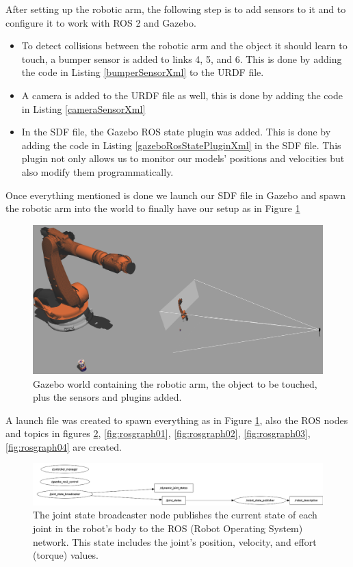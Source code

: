 \documentclass[12pt,oneside]{article}
\begin{document}
After setting up the robotic arm, the following step is to add sensors to it and to configure it to work with ROS 2 and Gazebo.
\begin{itemize}
\item To detect collisions between the robotic arm and the object it should learn to touch, a bumper sensor is added to links 4, 5, and 6. This is done by adding the code in Listing \ref{bumperSensorXml} to the URDF file.

\item A camera is added to the URDF file as well, this is done by adding the code in Listing \ref{cameraSensorXml}

\item In the SDF file, the Gazebo ROS state plugin was added. This is done by adding the code in Listing \ref{gazeboRosStatePluginXml} in the SDF file. This plugin not only allows us to monitor our models' positions and velocities but also modify them programmatically.
\end{itemize}

Once everything mentioned is done we launch our SDF file in Gazebo and spawn the robotic arm into the world to finally have our setup as in Figure \ref{fig:kuka4}

\begin{figure}[H]
	\centering
	\includegraphics[width=0.95\linewidth]{kuka4}
	\caption[Gazebo World]{Gazebo world containing the robotic arm, the object to be touched, plus the sensors and plugins added.}
	\label{fig:kuka4}
\end{figure}

A launch file was created to spawn everything as in Figure \ref{fig:kuka4}, also the ROS nodes and topics in figures \ref{fig:rosgraph00}, \ref{fig:rosgraph01}, \ref{fig:rosgraph02}, \ref{fig:rosgraph03}, \ref{fig:rosgraph04} are created.


\begin{figure}[H]
\centering
\includegraphics[width=0.95\linewidth]{rosgraph00}
\caption{The joint state broadcaster node publishes the current state of each joint in the robot's body to the ROS (Robot Operating System) network. This state includes the joint's position, velocity, and effort (torque) values. }
\label{fig:rosgraph00}
\end{figure}
 
\end{document}
